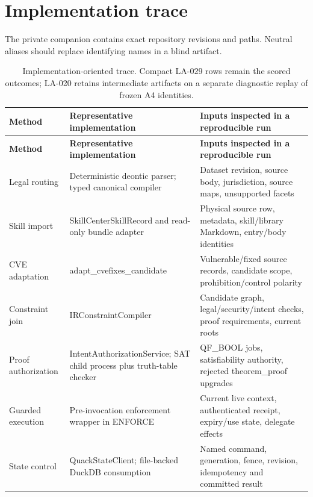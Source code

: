 \documentclass{article}
\begin{document}
\section{Implementation trace}

The private companion contains exact repository revisions and paths. Neutral aliases should replace identifying names in a blind artifact.
\begingroup
\renewcommand{\thetable}{D1}
\begin{longtable}{@{}>{\raggedright\arraybackslash}p{.24\linewidth} >{\raggedright\arraybackslash}p{.32\linewidth} >{\raggedright\arraybackslash}p{.38\linewidth}@{}}
\caption{Implementation-oriented trace. Compact LA-029 rows remain the scored outcomes; LA-020 retains intermediate artifacts on a separate diagnostic replay of frozen A4 identities.}\label{tab:D1}\\
\toprule
\textbf{Method} & \textbf{Representative implementation} & \textbf{Inputs inspected in a reproducible run} \\
\midrule
\endfirsthead
\textbf{Method} & \textbf{Representative implementation} & \textbf{Inputs inspected in a reproducible run} \\
\midrule
\endhead
\bottomrule
\endlastfoot
Legal routing & Deterministic deontic parser; typed canonical compiler & Dataset revision, source body, jurisdiction, source maps, unsupported facets \\[3pt]
Skill import & SkillCenterSkillRecord and read-only bundle adapter & Physical source row, metadata, skill/library Markdown, entry/body identities \\[3pt]
CVE adaptation & adapt\_\allowbreak{}cvefixes\_\allowbreak{}candidate & Vulnerable/fixed source records, candidate scope, prohibition/control polarity \\[3pt]
Constraint join & IRConstraintCompiler & Candidate graph, legal/security/intent checks, proof requirements, current roots \\[3pt]
Proof authorization & IntentAuthorizationService; SAT child process plus truth-table checker & QF\_BOOL jobs, satisfiability authority, rejected theorem\_proof upgrades \\[3pt]
Guarded execution & Pre-invocation enforcement wrapper in ENFORCE & Current live context, authenticated receipt, expiry/use state, delegate effects \\[3pt]
State control & QuackStateClient; file-backed DuckDB consumption & Named command, generation, fence, revision, idempotency and committed result \\[3pt]
\end{longtable}
\endgroup
\end{document}
